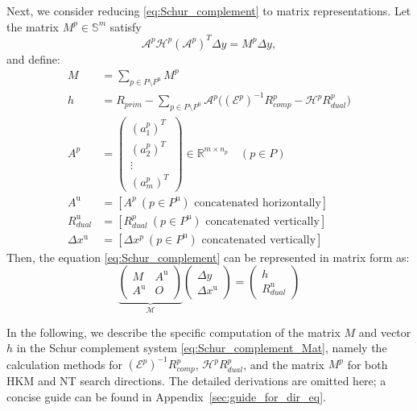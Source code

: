 Next, we consider reducing \eqref{eq:Schur_complement} to matrix representations. 
Let the matrix $M^p \in \mathbb{S}^{m}$ satisfy
\[
    \mathcal{A}^p\mathcal{H}^p(\mathcal{A}^p)^T \Delta y= M^p \Delta y,
\]
and define:
\begin{align*}
    M &= \sum_{p \in P \setminus P^{\text{u}}} M^p \\
    h &= R_{prim} - \sum_{p \in P \setminus P^{\text{u}}} \mathcal{A}^p\big((\mathcal{E}^p)^{-1}R_{comp}^p - \mathcal{H}^p R_{dual}^p\big)\\
    A^p &= \begin{pmatrix}
        (a^p_1)^T\\
        (a^p_2)^T\\
        \vdots\\
        (a^p_m)^T
    \end{pmatrix} \in \mathbb{R}^{m\times n_p} \quad (p\in P)\\
    A^{\text{u}} &= [ A^p ~ (p\in P^{\text{u}})\text{ concatenated horizontally} ]\\
    R^{\text{u}}_{dual} &= [ R^p_{dual} ~ (p\in P^{\text{u}})\text{ concatenated vertically} ]\\
    \Delta x^{\text{u}} &= [ \Delta x^p ~ (p\in P^{\text{u}})\text{ concatenated vertically} ]
\end{align*}
Then, the equation \eqref{eq:Schur_complement} can be represented in matrix form as:
\begin{equation}
    \underbrace{\left(\begin{array}{cc}
        M   & A^{\text{u}} \\
        A^{\text{u}} & O
    \end{array}\right)}_{\mathcal{M}}
    \left(\begin{array}{c}
        \Delta y   \\
        \Delta x^{\text{u}} 
    \end{array}\right) 
    = 
    \left(\begin{array}{c}
         h  \\
         R_{dual}^{\text{u}} 
    \end{array}
    \right)
    \label{eq:Schur_complement_Mat}
\end{equation}

\medskip

In the following, we describe the specific computation of the matrix $M$ and vector $h$ in the Schur complement system \eqref{eq:Schur_complement_Mat}, namely the calculation methods for $(\mathcal{E}^p)^{-1}R^p_{comp}$, $\mathcal{H}^p R^p_{dual}$, and the matrix $M^p$ for both HKM and NT search directions. 
The detailed derivations are omitted here; a concise guide can be found in Appendix~\ref{sec:guide_for_dir_eq}. 

